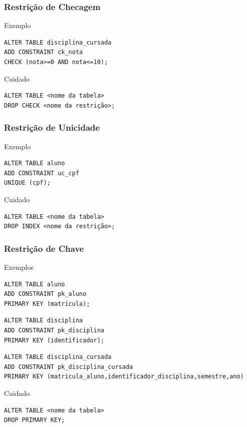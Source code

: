 \documentclass{beamer}
\begin{document}
\begin{frame}[fragile]
\frametitle{Restrição de Checagem}

\begin{exampleblock}{Exemplo}
\begin{lstlisting}
ALTER TABLE disciplina_cursada
ADD CONSTRAINT ck_nota 
CHECK (nota>=0 AND nota<=10);
\end{lstlisting}
\end{exampleblock}\vfill

\begin{alertblock}{Cuidado}
	\begin{lstlisting}
ALTER TABLE <nome da tabela>
DROP CHECK <nome da restrição>;
	\end{lstlisting}
\end{alertblock}
\end{frame}

\begin{frame}[fragile]
\frametitle{Restrição de Unicidade}

\begin{exampleblock}{Exemplo}
	\begin{lstlisting}
ALTER TABLE aluno
ADD CONSTRAINT uc_cpf
UNIQUE (cpf);
	\end{lstlisting}
\end{exampleblock}\vfill

\begin{alertblock}{Cuidado}
	\begin{lstlisting}
ALTER TABLE <nome da tabela>
DROP INDEX <nome da restrição>;
	\end{lstlisting}
\end{alertblock}
\end{frame}

\begin{frame}[fragile]
\frametitle{Restrição de Chave}

\begin{exampleblock}{Exemplos}
	\begin{lstlisting}
ALTER TABLE aluno
ADD CONSTRAINT pk_aluno 
PRIMARY KEY (matricula);
	\end{lstlisting}

	\begin{lstlisting}
ALTER TABLE disciplina
ADD CONSTRAINT pk_disciplina 
PRIMARY KEY (identificador);
	\end{lstlisting}
	
	\begin{lstlisting}
ALTER TABLE disciplina_cursada
ADD CONSTRAINT pk_disciplina_cursada
PRIMARY KEY (matricula_aluno,identificador_disciplina,semestre,ano)	
	\end{lstlisting}
\end{exampleblock}\vfill

\begin{alertblock}{Cuidado}
	\begin{lstlisting}
ALTER TABLE <nome da tabela>
DROP PRIMARY KEY;
	\end{lstlisting}
\end{alertblock}
\end{frame}
\end{document}
